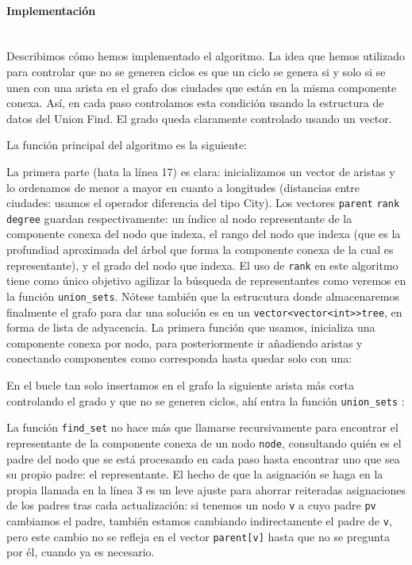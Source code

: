 \documentclass{article}
\newcommand{\myparagraph}[1]{\paragraph{#1}\mbox{}\\}
\begin{document}
\myparagraph{Implementación}
Describimos cómo hemos implementado el algoritmo. La idea que hemos utilizado para controlar que no se generen ciclos es que un ciclo se genera si y solo si se unen con una arista en el grafo dos ciudades
que están en la misma componente conexa. Así, en cada paso
controlamos esta condición usando la estructura de datos del Union Find. El grado queda claramente controlado usando un vector.

La función principal del algoritmo es la siguiente:
 
 

 La primera parte (hata la línea 17) es clara: inicializamos
 un vector de aristas y lo ordenamos de menor a mayor en cuanto a longitudes (distancias entre ciudades: usamos el operador diferencia del tipo City). Los vectores \verb |parent| \verb |rank| \verb |degree| guardan respectivamente: un índice al nodo
 representante de la componente conexa del nodo que indexa, el
 rango del nodo que indexa (que es la profundiad aproximada
 del árbol que forma la componente conexa de la cual es representante), y el grado del nodo que indexa. El uso de \verb |rank| en este algoritmo tiene como único objetivo agilizar la búsqueda de representantes como veremos en la función \verb |union_sets|. Nótese también que la estrucutura donde almacenaremos finalmente el grafo para dar una solución es en un \verb |vector<vector<int>>tree|, en forma de lista de adyacencia. La primera función que usamos, inicializa una componente
 conexa por nodo, para posteriormente ir añadiendo aristas
y conectando componentes como corresponda hasta quedar solo con una:
 

En el bucle tan solo insertamos en el grafo la siguiente arista
más corta controlando el grado y que no se generen ciclos, ahí entra la función \verb |union_sets| :

 

 La función \verb|find_set| no hace más que llamarse recursivamente para
 encontrar el representante de la componente conexa de un nodo \verb|node|, consultando quién es el padre del nodo que
 se está procesando en cada paso hasta encontrar uno que
 sea su propio padre: el representante. El hecho de que
 la asignación se haga en la propia llamada en la línea 3 es un leve ajuste para ahorrar reiteradas asignaciones de los padres
 tras cada actualización: si tenemos un nodo \verb|v| a cuyo padre \verb|pv| cambiamos el padre, también estamos cambiando indirectamente el padre de \verb|v|, pero este cambio no se
 refleja en el vector \verb|parent[v]| hasta que no se pregunta por él, cuando ya es necesario.
\end{document}
